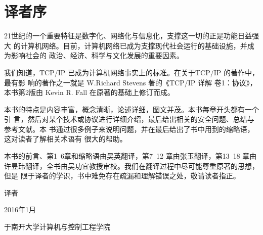\chapter*{译者序}

21世纪的一个重要特征是数字化、网络化与信息化，支撑这一切的正是功能日益强大
的计算机网络。目前，计算机网络已成为支撑现代社会运行的基础设施，并成为影响社会的
政治、经济、科学与文化发展的重要因素。

我们知道，TCP/IP 已成为计算机网络事实上的标准。在关于TCP/IP 的著作中，最有影
响的著作之一就是 W.Richard Stevens 著的《TCP/IP 详解 卷1：协议》，本书第2版由 Kevin
R. Fall 在原著的基础上修订而成。

本书的特点是内容丰富，概念清晰，论述详细，图文并茂。本书每章开头都有一个引
言，然后对某个技术或协议进行详细介绍，最后给出相关的安全问题、总结与参考文献。本
书通过很多例子来说明问题，并在最后给出了书中用到的缩略语，这对读者了解相关术语有
很大的帮助。

本书的前言、第1~6章和缩略语由吴英翻译，第7~12 章由张玉翻译，第13~18
章由许昱玮翻译，全书由吴功宜教授审校。我们在翻译过程中尽可能尊重原著的思想，但是
限于译者的学识，书中难免存在疏漏和理解错误之处，敬请读者指正。

\begin{flushright}
  译者
\end{flushright}
\begin{flushright}
  2016年1月
\end{flushright}
\begin{flushright}
  于南开大学计算机与控制工程学院
\end{flushright}
